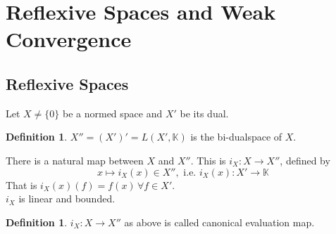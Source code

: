 \documentclass[a4paper, 12pt]{article}
\theoremstyle{plain}
\theoremstyle{definition}
\newtheorem{definition}[theorem]{Definition} %
\theoremstyle{lemma}
\theoremstyle{remark}
\theoremstyle{corollary}
\theoremstyle{example}
\begin{document}
\section{Reflexive Spaces and Weak Convergence}
	\subsection{Reflexive Spaces}
	Let $X \neq \{0\}$ be a normed space and $X'$ be its dual.
	\begin{definition}
		$X'' = (X')' = L(X',\mathbb{K})$ is the bi-dualspace of $X$.
	\end{definition}
	There is a natural map between $X$ and $X''$. This is $i_X: X \to X''$, defined by \[x\mapsto i_X(x) \in X'', \text{ i.e. } i_X(x):X'\to\mathbb{K}\]
	That is $i_X(x)(f) = f(x)\, \forall f \in X'$.\\
	$i_X$ is linear and bounded.
	\begin{definition}
		$i_X:X\to X''$ as above is called canonical evaluation map. 
	\end{definition}
\end{document}
